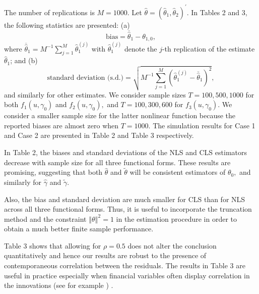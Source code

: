 \documentclass[12pt,a4paper]{article}
\begin{document}
The number of replications is $M=1000$. Let $\hat{\theta}=\left( \hat{\theta}%
_{1},\hat{\theta}_{2}\right) ^{\prime }.$ In Tables 2 and 3, the following
statistics are presented: (a)%
\[
\text{bias}=\overline{\hat{\theta}}_{1}-\theta _{1,0}, 
\]%
where $\overline{\hat{\theta}}_{1}=M^{-1}\sum_{j=1}^{M}\hat{\theta}%
_{1}^{(j)} $ with $\hat{\theta}_{1}^{(j)}$ denote the $j$-th replication of
the estimate $\hat{\theta}_{1}$; and (b) 
\[
\text{standard deviation (s.d.)}=\sqrt{M^{-1}\sum_{j=1}^{M}\left( \hat{\theta%
	}_{1}^{(j)}-\overline{\hat{\theta}}_{1}\right) ^{2}}, 
\]%
and similarly for other estimates. We consider sample sizes $T=100,500,1000$
for both $f_{1}\left( u,\gamma _{0}\right) $ and $f_{2}\left( u,\gamma
_{0}\right) ,$ and $T=100,300,600$ for $f_{3}\left( u,\gamma _{0}\right) $.
We consider a smaller sample size for the latter nonlinear function because the
reported biases are almost zero when $T=1000.$ The simulation results for
Case 1 and Case 2 are presented in Table 2 and Table 3 respectively.

In Table 2, the biases and standard deviations of the NLS and CLS estimators
decrease with sample size for all three functional forms. These results are
promising, suggesting that both $\hat{\theta}$ and $\tilde{\theta}$ will be
consistent estimators of $\theta _{0},$ and similarly for $\hat{\gamma}$ and 
$\tilde{\gamma}.$

Also, the bias and standard deviation are much smaller for CLS
than for NLS across all three functional forms. Thus, it is useful to
incorporate the truncation method and the constraint $\left\Vert \theta
\right\Vert ^{2}=1$ in the estimation procedure in order to obtain a much
better finite sample performance.

Table 3 shows that allowing for $\rho =0.5$ does not alter the conclusion quantitatively and hence our results are robust to the presence of
contemporaneous correlation between the residuals. The results in Table 3 are useful in practice especially when financial variables
often display correlation in the innovations (see for example \cite{amihud2008multiple}) .
\end{document}
